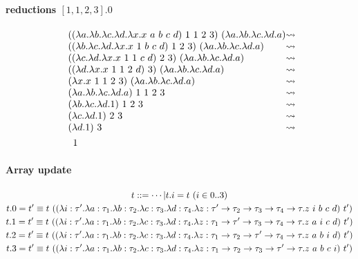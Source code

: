 \documentclass{article}
\newcommand{\lam}[2]{\ensuremath{\lambda#1.#2}}
\begin{document}
\paragraph{reductions $[1,1,2,3].0$}
\begin{align*}
    &\begin{array}{l @{\leadsto}l}
        ((\lam{a}\lam{b}\lam{c}\lam{d}\lam{x}{x\ a\ b\ c\ d})\ 1\ 1\ 2\ 3)\ (\lam{a}\lam{b}\lam{c}\lam{d}{a}) \\
        ((\lam{b}\lam{c}\lam{d}\lam{x}{x\ 1\ b\ c\ d})\ 1\ 2\ 3)\ (\lam{a}\lam{b}\lam{c}\lam{d}{a}) \\
        ((\lam{c}\lam{d}\lam{x}{x\ 1\ 1\ c\ d})\ 2\ 3)\ (\lam{a}\lam{b}\lam{c}\lam{d}{a}) \\
        ((\lam{d}\lam{x}{x\ 1\ 1\ 2\ d})\ 3)\ (\lam{a}\lam{b}\lam{c}\lam{d}{a}) \\
        (\lam{x}{x\ 1\ 1\ 2\ 3})\ (\lam{a}\lam{b}\lam{c}\lam{d}{a}) \\
        (\lam{a}\lam{b}\lam{c}\lam{d}{a})\ 1\ 1\ 2\ 3 \\
        (\lam{b}\lam{c}\lam{d}{1})\ 1\ 2\ 3 \\
        (\lam{c}\lam{d}{1})\ 2\ 3 \\
        (\lam{d}{1})\ 3 \\
    \end{array} \\
    & \quad 1
\end{align*}

\paragraph{Array update}
\begin{gather*}
    t ::= \cdots | t.i=t\ (i\in0..3) \\
    t.0=t' \equiv t\ ((\lam{i:\tau'}\lam{a:\tau_1}\lam{b:\tau_2}\lam{c:\tau_3}\lam{d:\tau_4}{\lam{z:\tau'\to\tau_2\to\tau_3\to\tau_4\to\tau}{z\ i\ b\ c\ d}})\ t') \\
    t.1=t' \equiv t\ ((\lam{i:\tau'}\lam{a:\tau_1}\lam{b:\tau_2}\lam{c:\tau_3}\lam{d:\tau_4}{\lam{z:\tau_1\to\tau'\to\tau_3\to\tau_4\to\tau}{z\ a\ i\ c\ d}})\ t') \\
    t.2=t' \equiv t\ ((\lam{i:\tau'}\lam{a:\tau_1}\lam{b:\tau_2}\lam{c:\tau_3}\lam{d:\tau_4}{\lam{z:\tau_1\to\tau_2\to\tau'\to\tau_4\to\tau}{z\ a\ b\ i\ d}})\ t') \\
    t.3=t' \equiv t\ ((\lam{i:\tau'}\lam{a:\tau_1}\lam{b:\tau_2}\lam{c:\tau_3}\lam{d:\tau_4}{\lam{z:\tau_1\to\tau_2\to\tau_3\to\tau'\to\tau}{z\ a\ b\ c\ i}})\ t')
\end{gather*}
\end{document}
